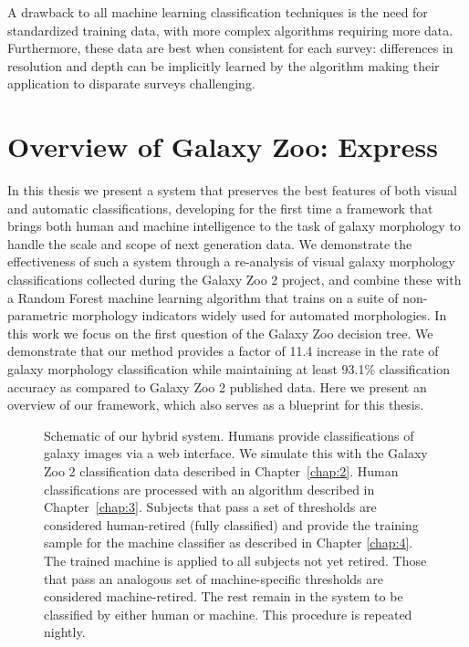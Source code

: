 A drawback to all machine learning classification techniques is the need for standardized training data, with more complex algorithms requiring more data. Furthermore, these data are best when consistent for each survey: differences in resolution and depth can be implicitly learned by the algorithm making their application to disparate surveys challenging. 


\section{Overview of Galaxy Zoo: Express}

 In this thesis we present a system that preserves the best features of both visual and automatic classifications, developing for the first time a framework that brings both human and machine intelligence to the task of galaxy morphology to handle the scale and scope of next generation data. We demonstrate the effectiveness of such a system through a re-analysis of visual galaxy morphology classifications collected during the Galaxy Zoo 2 project, and combine these with a Random Forest machine learning algorithm that trains on a suite of non-parametric morphology indicators widely used for automated morphologies. In this work we focus on the first question of the Galaxy Zoo decision tree. We demonstrate that our method provides a factor of 11.4 increase in the rate of galaxy morphology classification  while maintaining at least 93.1\% classification accuracy as compared to Galaxy Zoo 2 published data. Here we present an overview of our framework, which also serves as a blueprint for this thesis. 


\begin{figure}
\caption[Schematic of the Galaxy Zoo: Express human+machine hybrid system.]{Schematic of our hybrid system. Humans provide classifications of galaxy images via a web interface. We simulate this with the Galaxy Zoo 2 classification data described in Chapter~\ref{chap:2}. Human classifications are processed with an algorithm described in Chapter~\ref{chap:3}. Subjects that pass a set of thresholds are considered human-retired (fully classified) and provide the training sample for the machine classifier as described in Chapter \ref{chap:4}. The trained machine is applied to all subjects not yet retired. Those that pass an analogous set of machine-specific thresholds are considered machine-retired. The rest remain in the system to be classified by either human or machine. This procedure is repeated  nightly. \label{fig: schematic}}
\end{figure}


